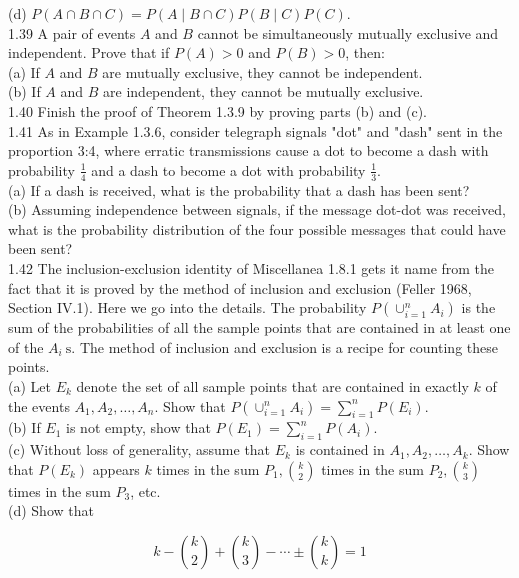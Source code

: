 \documentclass[10pt]{article}
\begin{document}
(d) $P(A \cap B \cap C)=P(A \mid B \cap C) P(B \mid C) P(C)$.\\
1.39 A pair of events $A$ and $B$ cannot be simultaneously mutually exclusive and independent. Prove that if $P(A)>0$ and $P(B)>0$, then:\\
(a) If $A$ and $B$ are mutually exclusive, they cannot be independent.\\
(b) If $A$ and $B$ are independent, they cannot be mutually exclusive.\\
1.40 Finish the proof of Theorem 1.3.9 by proving parts (b) and (c).\\
1.41 As in Example 1.3.6, consider telegraph signals "dot" and "dash" sent in the proportion 3:4, where erratic transmissions cause a dot to become a dash with probability $\frac{1}{4}$ and a dash to become a dot with probability $\frac{1}{3}$.\\
(a) If a dash is received, what is the probability that a dash has been sent?\\
(b) Assuming independence between signals, if the message dot-dot was received, what is the probability distribution of the four possible messages that could have been sent?\\
1.42 The inclusion-exclusion identity of Miscellanea 1.8.1 gets it name from the fact that it is proved by the method of inclusion and exclusion (Feller 1968, Section IV.1). Here we go into the details. The probability $P\left(\cup_{i=1}^{n} A_{i}\right)$ is the sum of the probabilities of all the sample points that are contained in at least one of the $A_{i} \mathrm{~s}$. The method of inclusion and exclusion is a recipe for counting these points.\\
(a) Let $E_{k}$ denote the set of all sample points that are contained in exactly $k$ of the events $A_{1}, A_{2}, \ldots, A_{n}$. Show that $P\left(\cup_{i=1}^{n} A_{i}\right)=\sum_{i=1}^{n} P\left(E_{i}\right)$.\\
(b) If $E_{1}$ is not empty, show that $P\left(E_{1}\right)=\sum_{i=1}^{n} P\left(A_{i}\right)$.\\
(c) Without loss of generality, assume that $E_{k}$ is contained in $A_{1}, A_{2}, \ldots, A_{k}$. Show that $P\left(E_{k}\right)$ appears $k$ times in the sum $P_{1},\binom{k}{2}$ times in the sum $P_{2},\binom{k}{3}$ times in the sum $P_{3}$, etc.\\
(d) Show that

$$
k-\binom{k}{2}+\binom{k}{3}-\cdots \pm\binom{ k}{k}=1
$$
\end{document}
